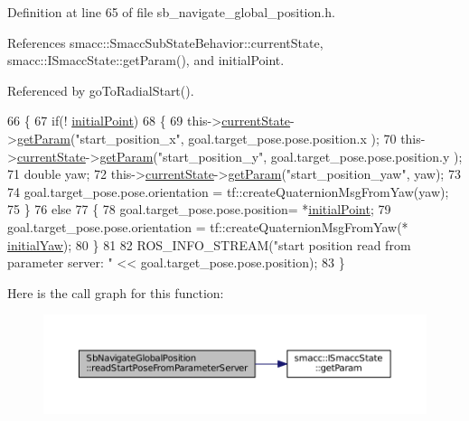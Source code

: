 Definition at line 65 of file sb\+\_\+navigate\+\_\+global\+\_\+position.\+h.



References smacc\+::\+Smacc\+Sub\+State\+Behavior\+::current\+State, smacc\+::\+I\+Smacc\+State\+::get\+Param(), and initial\+Point.



Referenced by go\+To\+Radial\+Start().


\begin{DoxyCode}
66   \{
67     \textcolor{keywordflow}{if}(! \hyperlink{classSbNavigateGlobalPosition_a676844c9140653b6bc60e8efaa75df44}{initialPoint})
68     \{
69       this->\hyperlink{classsmacc_1_1SmaccSubStateBehavior_a62e2b9da4a446f09396d0b4c01659b88}{currentState}->\hyperlink{classsmacc_1_1ISmaccState_abbb3a24b912c6e8de28f7b86123b6357}{getParam}(\textcolor{stringliteral}{"start\_position\_x"}, goal.target\_pose.pose.position.x
      );
70       this->\hyperlink{classsmacc_1_1SmaccSubStateBehavior_a62e2b9da4a446f09396d0b4c01659b88}{currentState}->\hyperlink{classsmacc_1_1ISmaccState_abbb3a24b912c6e8de28f7b86123b6357}{getParam}(\textcolor{stringliteral}{"start\_position\_y"}, goal.target\_pose.pose.position.y
      );
71       \textcolor{keywordtype}{double} yaw;
72       this->\hyperlink{classsmacc_1_1SmaccSubStateBehavior_a62e2b9da4a446f09396d0b4c01659b88}{currentState}->\hyperlink{classsmacc_1_1ISmaccState_abbb3a24b912c6e8de28f7b86123b6357}{getParam}(\textcolor{stringliteral}{"start\_position\_yaw"}, yaw);
73 
74       goal.target\_pose.pose.orientation = tf::createQuaternionMsgFromYaw(yaw);
75     \}
76     \textcolor{keywordflow}{else}
77     \{
78       goal.target\_pose.pose.position= *\hyperlink{classSbNavigateGlobalPosition_a676844c9140653b6bc60e8efaa75df44}{initialPoint};
79       goal.target\_pose.pose.orientation = tf::createQuaternionMsgFromYaw(*
      \hyperlink{classSbNavigateGlobalPosition_a3c2a5e765e4a7f4bfe19c458ab469515}{initialYaw});
80     \}
81     
82     ROS\_INFO\_STREAM(\textcolor{stringliteral}{"start position read from parameter server: "} << goal.target\_pose.pose.position);
83   \}
\end{DoxyCode}


Here is the call graph for this function\+:
\nopagebreak
\begin{figure}[H]
\begin{center}
\leavevmode
\includegraphics[width=350pt]{classSbNavigateGlobalPosition_a497b26df556f99524164619deb5b2352_cgraph}
\end{center}
\end{figure}




